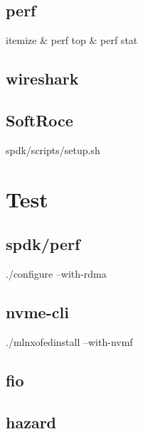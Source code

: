 \subsection{perf}

\begin{myeasylist}{itemize}
& perf top
& perf stat
\end{myeasylist}

\subsection{wireshark}

\subsection{SoftRoce}

spdk/scripts/setup.sh

\section{Test}

\subsection{spdk/perf}

./configure --with-rdma

\subsection{nvme-cli}

./mlnxofedinstall --with-nvmf

\subsection{fio}

\subsection{hazard}

